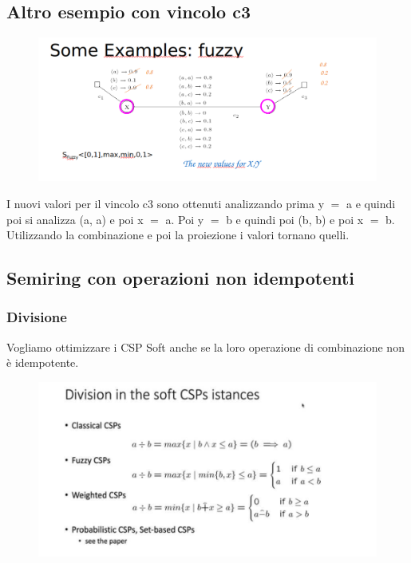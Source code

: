 \subsection{Altro esempio con vincolo c3}
\begin{figure}[H]
    \centering
    \includegraphics[width=16cm, keepaspectratio]{img/Cap5/FUZZY2.png}
\end{figure}
I nuovi valori per il vincolo c3 sono ottenuti analizzando prima y $=$ a e quindi poi si analizza (a, a) e poi x $=$ a. Poi y $=$ b e quindi poi (b, b) e poi x $=$ b. Utilizzando la combinazione e poi la proiezione i valori tornano quelli.
\subsection{Semiring con operazioni non idempotenti}
\subsubsection{Divisione}
Vogliamo ottimizzare i CSP Soft anche se la loro operazione di combinazione non è idempotente.
\begin{figure}[H]
    \centering
    \includegraphics[width=12cm, keepaspectratio]{img/Cap5/DIvisione.png}
\end{figure}

